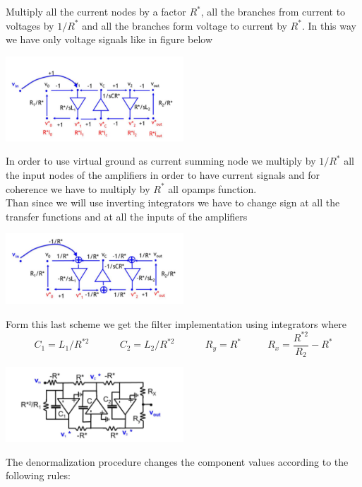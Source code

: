 Multiply all the current nodes by a factor $R^*$, all the branches from current to voltages by $1/R^*$ and all the branches form voltage to current by $R^*$. In this way we have only voltage signals like in figure below

\centering
\includegraphics[width=0.5\textwidth]{ldd4.png}\\
\raggedright

In order to use virtual ground as current summing node we multiply by $1/R^*$ all the input nodes of the amplifiers in order to have current signals and for coherence we have to multiply by $R^*$ all opamps function.\\
Than since we will use inverting integrators we have to change sign at all the transfer functions and at all the inputs of the amplifiers

\centering
\includegraphics[width=0.5\textwidth]{ldd5.png}\\
\raggedright

Form this last scheme we get the filter implementation using integrators where 
\begin{equation}
C_1=L_1/R^{*2} \ \ \ \ \ \ \ \ \ \ \ \ \ \ C_2=L_2/R^{*2}  \ \ \ \ \ \ \ \ \ \ \ \ \ \ R_y=R^* \ \ \ \ \ \ \ \ \ \ \ \ R_x=\frac{R^{*2}}{R_2}-R^*
\end{equation}


\centering
\includegraphics[width=0.5\textwidth]{ldd6.png}\\
\raggedright


The denormalization procedure changes the component values according to the following rules:

